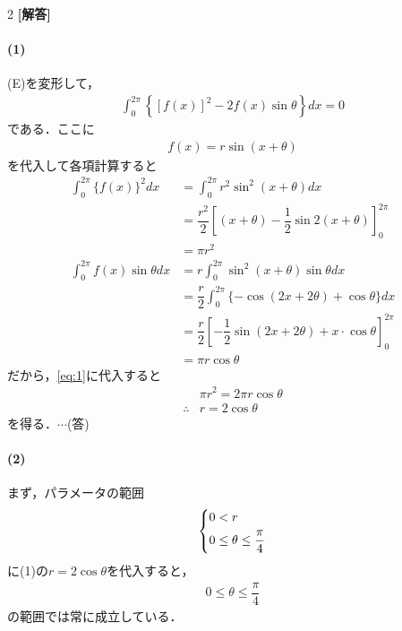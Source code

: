 \documentclass[../../main.tex]{subfiles}
\begin{document}
\setcounter{equation}{0}
\begin{oframed}
  
\end{oframed}
\setlength{\columnseprule}{0.4pt}
\begin{multicols}{2}
  {\bf [解答]}

  \paragraph{(1)}

  (E)を変形して，
  \begin{align}
    \int_0^{2\pi} \left\{[f(x)]^2 - 2f(x)\sin\theta\right\}dx = 0 \label{eq:1}
  \end{align}
  である．ここに
  \begin{align}
    f(x) = r\sin(x+\theta)
  \end{align}
  を代入して各項計算すると
  \begin{align}
    \int_0^{2\pi} \{f(x)\}^2dx
    & = \int_0^{2\pi} r^2 \sin^2(x+\theta) dx                                                 \\
    & = \dfrac{r^2}{2} \left[ (x+\theta) - \dfrac{1}{2}\sin 2(x+\theta) \right]_0^{2\pi}        \\
    & = \pi r^2                                                                               \\
    \int_0^{2\pi} f(x)\sin\theta dx
    & = r \int_0^{2\pi} \sin^2(x+\theta)\sin\theta dx                                         \\
    & = \dfrac{r}{2} \int_0^{2\pi} \{-\cos(2x+2\theta) + \cos\theta\} dx                       \\
    & = \dfrac{r}{2} \left[-\dfrac{1}{2}\sin(2x+2\theta) +  x \cdot \cos\theta \right]_0^{2\pi} \\
    & = \pi r \cos\theta
  \end{align}
  だから，\cref{eq:1}に代入すると
  \begin{align}
    & \pi r^2 = 2\pi r \cos\theta \\
    \therefore
    & r = 2\cos\theta
  \end{align}
  を得る．$\cdots$(答)

  \paragraph{(2)}
  まず，パラメータの範囲
  \begin{align}
    \begin{dcases}
      0 < r \\
      0 \le \theta \le \dfrac{\pi}{4}
    \end{dcases}
  \end{align}
  に(1)の$r=2\cos\theta$を代入すると，
  \begin{align}
    0 \le \theta \le \dfrac{\pi}{4} \label{eq:2}
  \end{align}
  の範囲では常に成立している．


\end{multicols}
\end{document}
